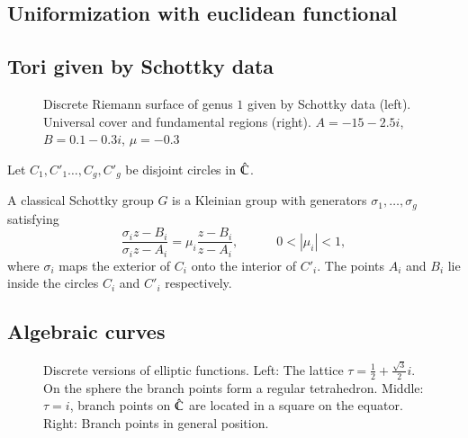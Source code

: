 \documentclass[Thesis.tex]{subfiles}
\begin{document}
\subsection{Uniformization with euclidean functional}

\subsection{Tori given by Schottky data}

\begin{figure}
\centering
{}
\caption{Discrete Riemann surface of genus $1$ given by Schottky data (left). Universal cover and fundamental regions (right). $A=-15-2.5i$, $B=0.1-0.3i$, $\mu=-0.3$}
\label{fig:schottky_g1}
\end{figure}

Let $C_1,C'_1\ldots,C_g,C'_g$ be disjoint circles in $\hat{\mathbb C}$.
\begin{definition} A classical Schottky group $G$ is a Kleinian group with generators $\sigma_1,\ldots,\sigma_g$ satisfying
\[
\frac{\sigma_i z - B_i}{\sigma_i z - A_i} = \mu_i \frac{z - B_i}{z - A_i},
\quad\quad\quad 0 < \left|\mu_i\right|<1,
\]
where $\sigma_i$ maps the exterior of $C_i$ onto the interior of $C'_i$. The points $A_i$ and $B_i$ lie inside the circles $C_i$ and $C'_i$ respectively.
\end{definition}

\subsection{Algebraic curves}
\label{sec:discrete_algebraic_curves}

\begin{figure}
\centering
{}
\caption{Discrete versions of elliptic functions. Left: The lattice $\tau=\frac{1}{2}+\frac{\sqrt 3}{2}i$. On the sphere the branch points form a regular tetrahedron. Middle: $\tau=i$, branch points on $\hat {\mathbb C}$ are located in a square on the equator. Right: Branch points in general position.}
\label{fig:p_functions}
\end{figure}
\end{document}
